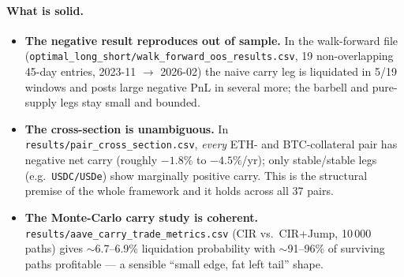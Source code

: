 \documentclass[11pt]{article}
\newcommand{\code}[1]{\texttt{\small #1}}
\begin{document}
\paragraph{What is solid.}
\begin{itemize}
  \item \textbf{The negative result reproduces out of sample.} In the
  walk-forward file (\code{optimal\_long\_short/walk\_forward\_oos\_results.csv},
  19 non-overlapping 45-day entries, 2023-11 $\to$ 2026-02) the naive carry leg
  is liquidated in 5/19 windows and posts large negative PnL in several more; the
  barbell and pure-supply legs stay small and bounded.
  \item \textbf{The cross-section is unambiguous.} In
  \code{results/pair\_cross\_section.csv}, \emph{every} ETH- and BTC-collateral
  pair has negative net carry (roughly $-1.8\%$ to $-4.5\%$/yr); only stable/stable
  legs (e.g.\ \code{USDC/USDe}) show marginally positive carry. This is the
  structural premise of the whole framework and it holds across all 37 pairs.
  \item \textbf{The Monte-Carlo carry study is coherent.}
  \code{results/aave\_carry\_trade\_metrics.csv} (CIR vs.\ CIR+Jump, 10\,000 paths)
  gives $\sim$6.7--6.9\% liquidation probability with $\sim$91--96\% of surviving
  paths profitable --- a sensible ``small edge, fat left tail'' shape.
\end{itemize}
\end{document}
